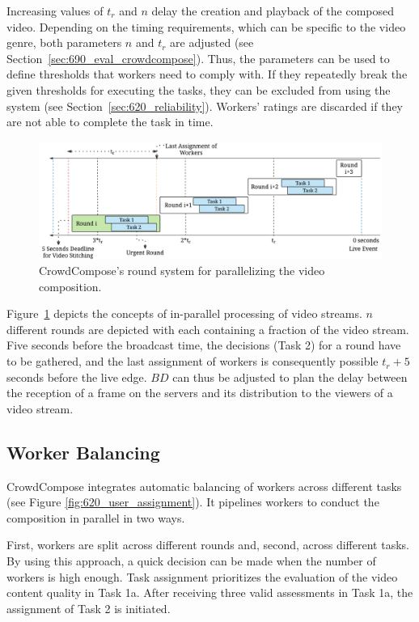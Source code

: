 Increasing values of $t_{r}$ and $n$ delay the creation and playback of the composed video. 
Depending on the timing requirements, which can be specific to the video genre, both parameters $n$ and $t_{r}$ are adjusted (see Section~\ref{sec:690_eval_crowdcompose}). 
Thus, the parameters can be used to define thresholds that workers need to comply with.
If they repeatedly break the given thresholds for executing the tasks, they can be excluded from using the system (see Section~\ref{sec:620_reliability}).
Workers' ratings are discarded if they are not able to complete the task in time. 

\begin{figure}
\centering
\includegraphics[width=\linewidth]{./gfx/600_Composition/rounds}
\caption[CrowdCompose's round system]{CrowdCompose's round system for parallelizing the video composition.}
\label{fig:620_rounds}
\end{figure}

Figure~\ref{fig:620_rounds} depicts the concepts of in-parallel processing of video streams.
$n$ different rounds are depicted with each containing a fraction of the video stream. 
Five seconds before the broadcast time, the decisions (Task 2) for a round have to be gathered, and the last assignment of workers is consequently possible $t_r + 5$ seconds before the live edge.
$BD$ can thus be adjusted to plan the delay between the reception of a frame on the servers and its distribution to the viewers of a video stream.
\subsection{Worker Balancing}
CrowdCompose integrates automatic balancing of workers across different tasks (see Figure \ref{fig:620_user_assignment}). 
It pipelines workers to conduct the composition in parallel in two ways. 

First, workers are split across different rounds and, second, across different tasks. 
By using this approach, a quick decision can be made when the number of workers is high enough. 
Task assignment prioritizes the evaluation of the video content quality in Task 1a.
After receiving three valid assessments in Task 1a, the assignment of Task 2 is initiated.
 

